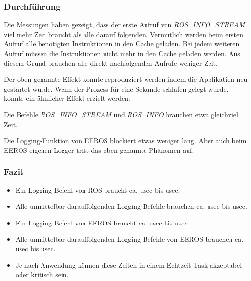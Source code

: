 \subsubsection{Durchführung}
Die Messungen haben gezeigt, dass der erste Aufruf von \textit{ROS\_INFO\_STREAM} viel mehr Zeit braucht als alle darauf folgenden.
Vermutlich werden beim ersten Aufruf alle benötigten Instruktionen in den Cache geladen.
Bei jedem weiteren Aufruf müssen die Instruktionen nicht mehr in den Cache geladen werden.
Aus diesem Grund brauchen alle direkt nachfolgenden Aufrufe weniger Zeit.

Der oben genannte Effekt konnte reproduziert werden indem die Applikation neu gestartet wurde.
Wenn der Prozess für eine Sekunde schlafen gelegt wurde, konnte ein ähnlicher Effekt erzielt werden.

Die Befehle \textit{ROS\_INFO\_STREAM} und \textit{ROS\_INFO} brauchen etwa gleichviel Zeit.

Die Logging-Funktion von EEROS blockiert etwas weniger lang.
Aber auch beim EEROS eigenen Logger tritt das oben genannte Phänomen auf.

\subsubsection{Fazit}
\begin{itemize}
\item Ein Logging-Befehl von ROS braucht ca. \unit[50]{usec} bis \unit[80]{usec}.
\item Alle unmittelbar darauffolgenden Logging-Befehle brauchen ca. \unit[10]{usec} bis \unit[15]{usec}.
\item Ein Logging-Befehl von EEROS braucht ca. \unit[30]{usec} bis \unit[70]{usec}.
\item Alle unmittelbar darauffolgenden Logging-Befehle von EEROS brauchen ca. \unit[3]{usec} bis \unit[15]{usec}.
\item Je nach Anwendung können diese Zeiten in einem Echtzeit Task akzeptabel oder kritisch sein.
\end{itemize}




